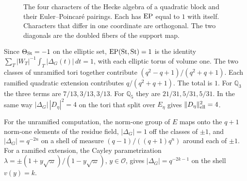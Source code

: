\begin{figure}[htbp]\centering
{}
\caption{The four characters of the Hecke algebra of a quadratic block and their Euler--Poincar\'e pairings. Each has $\operatorname{EP}$ equal to $1$ with itself. Characters that differ in one coordinate are orthogonal. The two diagonals are the doubled fibers of the support map.}\label{fig:grid}
\end{figure}

\begin{example}\label{ex:norm}Since $\Theta_{\operatorname{St}}=-1$ on the elliptic set, $\operatorname{EP}(\operatorname{St},\operatorname{St})=1$ is the identity $\sum_T|W_T|^{-1}\int_T|\Delta_G(t)|\,dt=1$, with each elliptic torus of volume one. The two classes of unramified tori together contribute $(q^2-q+1)/(q^2+q+1)$. Each ramified quadratic extension contributes $q/(q^2+q+1)$. The total is $1$. For $\mathbb Q_3$ the three terms are $7/13,3/13,3/13$. For $\mathbb Q_5$ they are $21/31,5/31,5/31$. In the same way $|\Delta_G|\,|D_\eta|^2=4$ on the tori that split over $E_\eta$ gives $\|D_\eta\|^2_{\rm ell}=4$.
\end{example}
For the unramified computation, the norm-one group of $E$ maps onto the $q+1$ norm-one elements of the residue field, $|\Delta_G|=1$ off the classes of $\pm1$, and $|\Delta_G|=q^{-2n}$ on a shell of measure $(q-1)/((q+1)q^n)$ around each of $\pm1$. For a ramified extension, the Cayley parametrization $\lambda=\pm(1+y\sqrt\varpi)/(1-y\sqrt\varpi)$, $y\in\mathcal O$, gives $|\Delta_G|=q^{-2k-1}$ on the shell $v(y)=k$.

